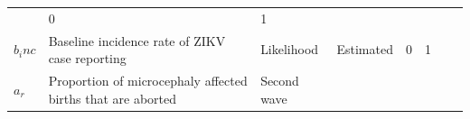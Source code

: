 \documentclass[10pt,letterpaper]{article}
\begin{document}
\begin{longtable}[]{@{}llllllll@{}}
\begin{minipage}[t]{0.05\columnwidth}
\end{minipage} & \begin{minipage}[t]{0.04\columnwidth}\raggedright\strut
0\strut
\end{minipage} & \begin{minipage}[t]{0.04\columnwidth}\raggedright\strut
1\strut
\end{minipage} & \begin{minipage}[t]{0.14\columnwidth}\raggedright\strut
\strut
\end{minipage} & \begin{minipage}[t]{0.26\columnwidth}\raggedright\strut
\strut
\end{minipage}\tabularnewline
\begin{minipage}[t]{0.04\columnwidth}\raggedright\strut
\(b_inc\)\strut
\end{minipage} & \begin{minipage}[t]{0.17\columnwidth}\raggedright\strut
Baseline incidence rate of ZIKV case reporting\strut
\end{minipage} & \begin{minipage}[t]{0.05\columnwidth}\raggedright\strut
Likelihood\strut
\end{minipage} & \begin{minipage}[t]{0.05\columnwidth}\raggedright\strut
Estimated\strut
\end{minipage} & \begin{minipage}[t]{0.04\columnwidth}\raggedright\strut
0\strut
\end{minipage} & \begin{minipage}[t]{0.04\columnwidth}\raggedright\strut
1\strut
\end{minipage} & \begin{minipage}[t]{0.14\columnwidth}\raggedright\strut
\strut
\end{minipage} & \begin{minipage}[t]{0.26\columnwidth}\raggedright\strut
\strut
\end{minipage}\tabularnewline
\begin{minipage}[t]{0.04\columnwidth}\raggedright\strut
\(a_r\)\strut
\end{minipage} & \begin{minipage}[t]{0.17\columnwidth}\raggedright\strut
Proportion of microcephaly affected births that are aborted\strut
\end{minipage} & \begin{minipage}[t]{0.05\columnwidth}\raggedright\strut
Second wave\strut
\end{minipage} & \begin{minipage}[t]{0.05\columnwidth}\raggedright\strut

\end{minipage}
\end{longtable}
\end{document}
